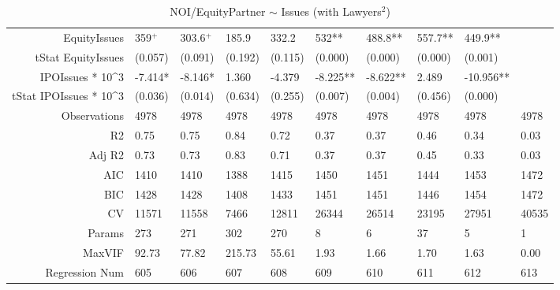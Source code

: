\begin{table}[ht]
\begin{tabular}{rlllllllll}
  EquityIssues & 359$^{+}$ & 303.6$^{+}$ & 185.9 & 332.2 & 532** & 488.8** & 557.7** & 449.9** &  \\ 
  tStat EquityIssues & (0.057) & (0.091) & (0.192) & (0.115) & (0.000) & (0.000) & (0.000) & (0.001) &  \\ 
  IPOIssues * 10^3 & -7.414* & -8.146* & 1.360 & -4.379 & -8.225** & -8.622** & 2.489 & -10.956** &  \\ 
  tStat IPOIssues * 10^3 & (0.036) & (0.014) & (0.634) & (0.255) & (0.007) & (0.004) & (0.456) & (0.000) &  \\ 
  Observations & 4978 & 4978 & 4978 & 4978 & 4978 & 4978 & 4978 & 4978 & 4978 \\ 
  R2 & 0.75 & 0.75 & 0.84 & 0.72 & 0.37 & 0.37 & 0.46 & 0.34 & 0.03 \\ 
  Adj R2 & 0.73 & 0.73 & 0.83 & 0.71 & 0.37 & 0.37 & 0.45 & 0.33 & 0.03 \\ 
  AIC & 1410 & 1410 & 1388 & 1415 & 1450 & 1451 & 1444 & 1453 & 1472 \\ 
  BIC & 1428 & 1428 & 1408 & 1433 & 1451 & 1451 & 1446 & 1454 & 1472 \\ 
  CV & 11571 & 11558 & 7466 & 12811 & 26344 & 26514 & 23195 & 27951 & 40535 \\ 
  Params & 273 & 271 & 302 & 270 & 8 & 6 & 37 & 5 & 1 \\ 
  MaxVIF & 92.73 & 77.82 & 215.73 & 55.61 & 1.93 & 1.66 & 1.70 & 1.63 & 0.00 \\ 
  Regression Num & 605 & 606 & 607 & 608 & 609 & 610 & 611 & 612 & 613 \\ 
   \hline
\end{tabular}
\caption{NOI/EquityPartner $\sim$ Issues (with Lawyers$^2$)} 
\end{table}
